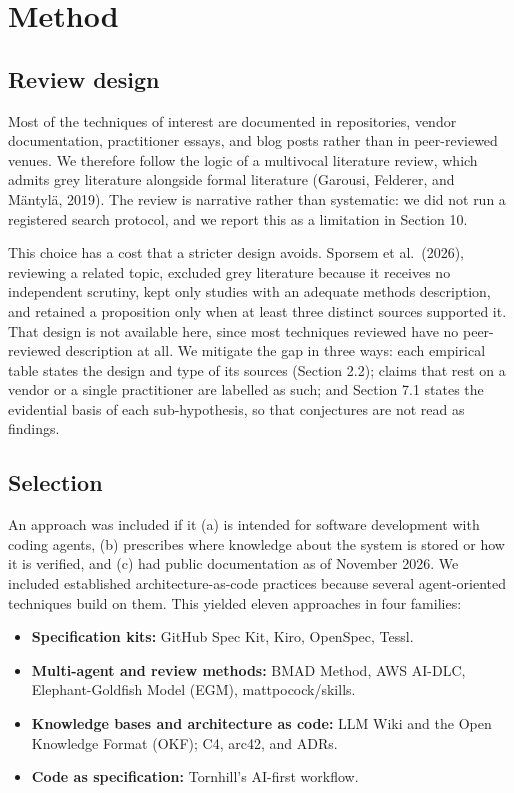 \documentclass[11pt]{article}
\begin{document}
\section{Method}

\subsection{Review design}

Most of the techniques of interest are documented in repositories, vendor documentation, practitioner essays, and blog posts rather than in peer-reviewed venues. We therefore follow the logic of a multivocal literature review, which admits grey literature alongside formal literature (Garousi, Felderer, and M\"antyl\"a, 2019). The review is narrative rather than systematic: we did not run a registered search protocol, and we report this as a limitation in Section 10.

This choice has a cost that a stricter design avoids. Sporsem et al.\ (2026), reviewing a related topic, excluded grey literature because it receives no independent scrutiny, kept only studies with an adequate methods description, and retained a proposition only when at least three distinct sources supported it. That design is not available here, since most techniques reviewed have no peer-reviewed description at all. We mitigate the gap in three ways: each empirical table states the design and type of its sources (Section 2.2); claims that rest on a vendor or a single practitioner are labelled as such; and Section 7.1 states the evidential basis of each sub-hypothesis, so that conjectures are not read as findings.

\subsection{Selection}

An approach was included if it (a) is intended for software development with coding agents, (b) prescribes where knowledge about the system is stored or how it is verified, and (c) had public documentation as of November 2026. We included established architecture-as-code practices because several agent-oriented techniques build on them. This yielded eleven approaches in four families:

\begin{itemize}[leftmargin=*]
  \item \textbf{Specification kits:} GitHub Spec Kit, Kiro, OpenSpec, Tessl.
  \item \textbf{Multi-agent and review methods:} BMAD Method, AWS AI-DLC, Elephant-Goldfish Model (EGM), mattpocock/skills.
  \item \textbf{Knowledge bases and architecture as code:} LLM Wiki and the Open Knowledge Format (OKF); C4, arc42, and ADRs.
  \item \textbf{Code as specification:} Tornhill's AI-first workflow.
\end{itemize}
\end{document}
